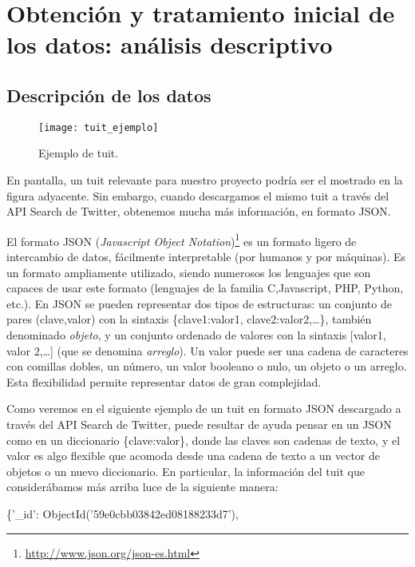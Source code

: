 \chapter{Obtención y tratamiento inicial de los datos: análisis descriptivo}
\label{chap:tratamiento_inicial_de_los_datos}

\section{Descripci\'on de los datos}


\begin{wrapfigure}[17]{R}{0.5\textwidth}
\texttt{[image: tuit\_ejemplo]}
\caption{Ejemplo de tuit.}\label{fig:tuit_ejemplo}
\end{wrapfigure} 


En pantalla, un tuit relevante para nuestro proyecto podría ser el 
mostrado en la figura ad\-ya\-cente. Sin embargo, cuando descargamos el mismo tuit a través del API Search de Twitter, 
obtenemos mucha más información, en formato JSON. 

El formato JSON ({\em Javascript Object Notation})\footnote{\url{http://www.json.org/json-es.html}} 
es un formato ligero de intercambio de datos, fácilmente interpretable (por humanos y por
máquinas). Es un formato ampliamente utilizado, siendo numerosos los
lenguajes que son capaces de usar este formato (lenguajes de la familia C,Javascript, PHP, Python, etc.). 
En JSON se pueden representar dos tipos
de estructuras: un conjunto de pares (clave,valor) con la sintaxis \{clave1:valor1, clave2:valor2,\dots\}, también
denominado {\em objeto}, y un conjunto ordenado de valores con la sintaxis [valor1, valor 2,\dots] (que se denomina {\em arreglo}). 
Un valor puede ser una cadena de caracteres con comillas dobles, un número, un valor booleano o nulo, 
un objeto o un arreglo. Esta flexibilidad permite representar datos de gran complejidad.

Como veremos en el siguiente ejemplo de un tuit en formato JSON descargado a través del API Search de Twitter,
puede resultar de ayuda pensar en un JSON como en un diccionario \{clave:valor\}, donde las claves
son cadenas de texto, y el valor es algo flexible que acomoda desde una cadena de texto a un vector de objetos 
o un nuevo diccionario. En particular, la información del tuit que considerábamos más arriba 
luce de la siguiente manera:

\bigskip


\{'\_id': ObjectId('59e0cbb03842ed08188233d7'),

